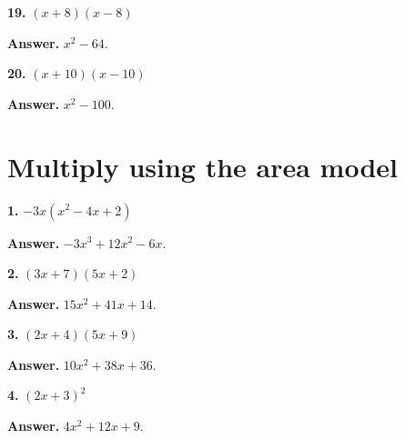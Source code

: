 \documentclass{ximera}
\begin{document}
\begin{problem}

\textbf{19.} $(x+8)(x-8)$

\begin{hint}
\textbf{Answer.} $x^{2} - 64$.
\end{hint}
\end{problem}

\begin{problem}

\textbf{20.} $(x+10)(x-10)$

\begin{hint}
\textbf{Answer.} $x^{2} - 100$.
\end{hint}
\end{problem}

\section*{Multiply using the area model}


\begin{problem}

\textbf{1.} $-3x\left(x^{2}-4x+2\right)$

\begin{hint}
\textbf{Answer.} $- 3 x^{3} + 12 x^{2} - 6 x$.
\end{hint}
\end{problem}

\begin{problem}

\textbf{2.} $(3x+7)(5x+2)$

\begin{hint}
\textbf{Answer.} $15 x^{2} + 41 x + 14$.
\end{hint}
\end{problem}

\begin{problem}

\textbf{3.} $(2x+4)(5x+9)$

\begin{hint}
\textbf{Answer.} $10 x^{2} + 38 x + 36$.
\end{hint}
\end{problem}

\begin{problem}

\textbf{4.} $(2x+3)^{2}$

\begin{hint}
\textbf{Answer.} $4 x^{2} + 12 x + 9$.
\end{hint}
\end{problem}
\end{document}
